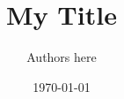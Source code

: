 \documentclass[11pt]{article}
\newcommand{\myname}{Authors here}
\begin{document}
\title{My Title}

\author{\myname}

\date{\today}
\maketitle

\begin{abstract}
\end{abstract}



\end{document}
